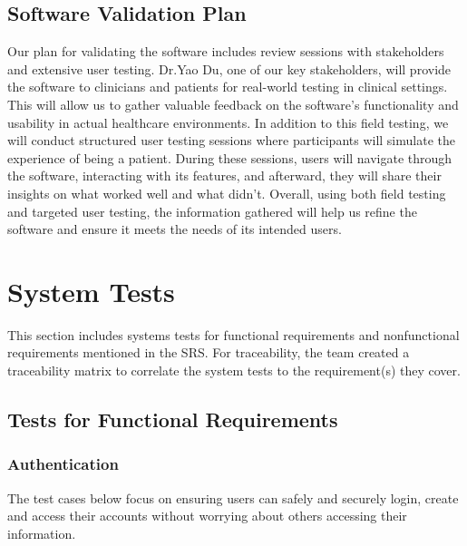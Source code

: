 \documentclass[12pt, titlepage]{article}
\begin{document}
\subsection{Software Validation Plan}

Our plan for validating the software includes review sessions with 
stakeholders and extensive user testing. Dr.Yao Du, one of our key 
stakeholders, will provide the software to clinicians and patients for 
real-world testing in clinical settings. This will allow us to gather 
valuable feedback on the software’s functionality and usability in 
actual healthcare environments. In addition to this field testing, we 
will conduct structured user testing sessions where participants will 
simulate the experience of being a patient. During these sessions, 
users will navigate through the software, interacting with its features,
and afterward, they will share their insights on what worked well and 
what didn’t. Overall, using both field testing and targeted user testing, the information
gathered will help us refine the 
software and ensure it meets the needs of its intended users. 

\newpage
\section{System Tests}
\hspace{2em}This section includes systems tests for functional requirements and nonfunctional
requirements mentioned in the SRS. For traceability, the team created a traceability
matrix to correlate the system tests to the requirement(s) they cover.

\subsection{Tests for Functional Requirements}

\subsubsection{Authentication}

\hspace{2em}The test cases below focus on ensuring users can safely and securely login, create and access
their accounts without worrying about others accessing their information.
\end{document}
